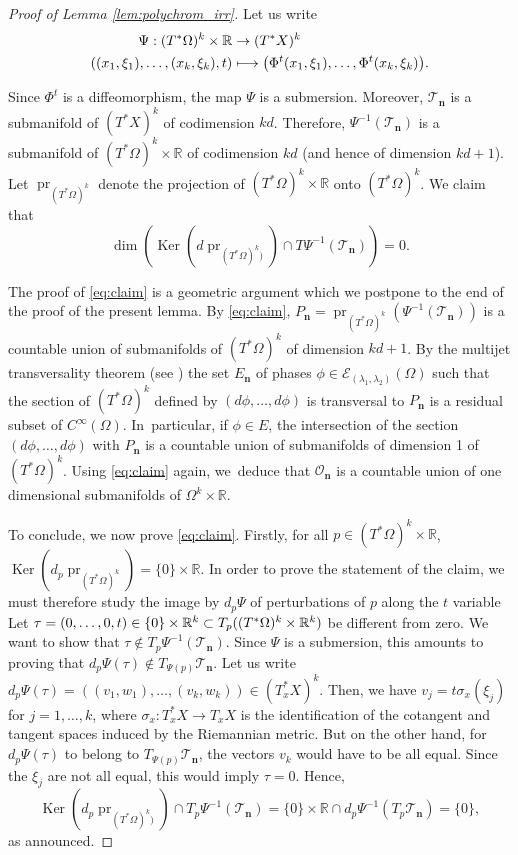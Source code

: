 \documentclass[10pt]{amsart}
\let\mathcal\mathscr
\newcommand\mto{\mathchoice{\longmapsto}{\mapsto}{\mapsto}{\mapsto}}
\DeclareMathOperator{\Ker}{Ker}
\theoremstyle{plain}
\theoremstyle{definition}
\newcommand{\R}{\mathbb{R}}
\def\calE{\mathcal{E}}
\def\calT{\mathcal{T}}
\DeclareMathOperator{\pr}{pr}
\begin{document}
\begin{proof}[Proof of Lemma \ref{lem:polychrom_irr}]
Let us write
\begin{align*}
\Psi:(T^*\Omega)^k\times\R&\to (T^*X)^k\\
((x_1,\xi_1),\dots,(x_k,\xi_k),t)&\mto \bigl(\Phi^{t}(x_1,\xi_1),\dots,\Phi^{t}(x_k,\xi_k) \bigr).
\end{align*}

Since $\Phi^{t}$ is a diffeomorphism, the map $\Psi$ is a submersion. Moreover, $\calT_{\boldsymbol{n}}$ is a submanifold of $(T^*X)^k$ of codimension $kd$. Therefore, $\Psi^{-1}(\calT_{\boldsymbol{n}})$ is a submanifold of $(T^*\Omega)^k\times\R$ of codimension $kd$ (and hence of dimension $kd+1$). Let $\pr_{(T^*\Omega)^k}$ denote the projection of $(T^*\Omega)^k\times\R$ onto $(T^*\Omega)^k$. We claim that
\begin{equation}\label{eq:claim}
\dim(\Ker(d\pr_{(T^*\Omega)^k)})\cap T\Psi^{-1}(\calT_{\boldsymbol{n}}))=0.
\end{equation}

The proof of \eqref{eq:claim} is a geometric argument which we postpone to the end of the proof of the present lemma. By \eqref{eq:claim}, $P_{\boldsymbol{n}}=\pr_{(T^*\Omega)^k}(\Psi^{-1}(\calT_{\boldsymbol{n}}))$ is a countable union of submanifolds of $(T^*\Omega)^k$ of dimension $kd+1$. By the multijet transversality theorem (see \cite[Th.\,4.13, Chap.\,2]{GG}) the set $E_{\boldsymbol{n}}$ of phases $\phi\in\calE_{(\lambda_1,\lambda_2)}(\Omega)$ such that the section of $(T^*\Omega)^k$ defined by $(d\phi,\dots,d\phi)$ is transversal to $P_{\boldsymbol{n}}$ is a residual subset of $C^\infty(\Omega)$. In~particular, if $\phi \in E$, the intersection of the section $(d\phi,\dots,d\phi)$ with $P_{\boldsymbol{n}}$ is a countable union of submanifolds of dimension 1 of $(T^*\Omega)^k$.
Using \eqref{eq:claim} again, we~deduce that $\mathcal{O}_{\boldsymbol{n}}$ is a countable union of one dimensional submanifolds of $\Omega^k\times \R$.

To conclude, we now prove \eqref{eq:claim}.
Firstly, for all $p\in (T^*\Omega)^k\times\R$, $\Ker(d_p\pr_{(T^*\Omega)^k})=\{0\}\times\R$. In order to prove the statement of the claim, we must therefore study the image by $d_p\Psi$ of perturbations of $p$ along the $t$ variable Let $\tau =(0,\dots,0, t)\in \{0\}\times\nobreak\R^k\subset T_p((T^*\Omega)^k\times\R^k)$ be different from zero. We want to show that $\tau \notin T_p \Psi^{-1}(\mathcal{T}_{\boldsymbol{n}})$. Since $\Psi$ is a submersion, this amounts to proving that $d_p\Psi(\tau) \notin T_{\Psi(p)}\calT_{\boldsymbol{n}}$. Let us write $d_p\Psi(\tau)=((v_1,w_1),\dots,(v_k,w_k))\in (T_x^*X)^k$. Then, we have $v_j= t \sigma_x(\xi_j)$ for $j=1,\dots,k$, where $\sigma_x : T_x^*X\to T_xX$ is the identification of the cotangent and tangent spaces induced by the Riemannian metric.
But on the other hand, for $d_p\Psi(\tau)$ to belong to $T_{\Psi(p)}\calT_{\boldsymbol{n}}$, the vectors $v_k$ would have to be all equal. Since the $\xi_j$ are not all equal, this would imply $\tau=0$. Hence,
\[
\Ker(d_p\pr_{(T^*\Omega)^k)})\cap T_p\Psi^{-1}(\calT_{\boldsymbol{n}})=\{0\}\times\R\cap d_p\Psi^{-1}(T_p\calT_{\boldsymbol{n}})=\{0\},
\]
as announced.
\end{proof}
\end{document}
